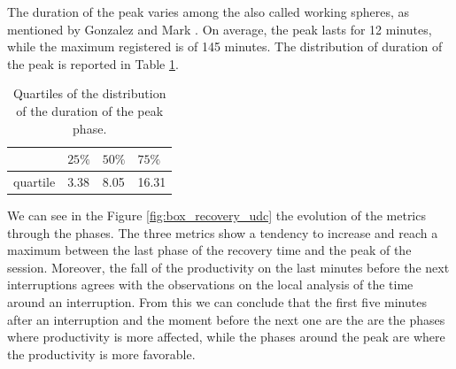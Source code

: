 \documentclass[times]{smrauth}
\begin{document}
The duration of the peak varies among the also called working spheres, as mentioned by Gonzalez and Mark \cite{MGH05}. On average, the peak lasts for 12 minutes, while the maximum registered is of 145 minutes. The distribution of duration of the peak is reported in Table \ref{tbl:dist_peaks}.

\begin{table}[ht!]
	\tiny
	\renewcommand{\arraystretch}{1.3}
	\caption{Quartiles of the distribution of the duration of the peak phase.}
	\label{tbl:dist_peaks}
	\centering
	\begin{tabular}{l | p{0.6cm} | p{0.6cm} | p{0.6cm}} 
		& $25\%$ & $50\%$ & $75\%$ \\  
		\hline 
		quartile & 3.38 & 8.05 & 16.31  \\   
	\end{tabular}
\end{table}


We can see in the Figure \ref{fig:box_recovery_udc} the evolution of the metrics through
the phases. The three metrics show a tendency to increase and reach a maximum between the last phase of the recovery time and the peak of the session. Moreover, the fall of the productivity on the last minutes before the next interruptions agrees with the observations on the local analysis of the time around an interruption. From this we can conclude that the first five minutes after an interruption and the moment before the next one are the are the phases where productivity is more affected, while the phases around the peak are where the productivity is more favorable.
\end{document}
